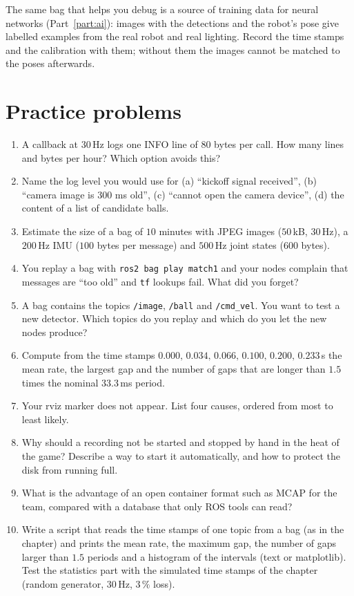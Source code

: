 \begin{aibox}
The same bag that helps you debug is a source of training data for neural networks (Part~\ref{part:ai}): images with the detections and the robot's pose give labelled examples from the real robot and real lighting. Record the time stamps and the calibration with them; without them the images cannot be matched to the poses afterwards.
\end{aibox}

\section*{Practice problems}
\begin{enumerate}[label=\textbf{\thechapter.\arabic*}]
  \item A callback at $30$\,Hz logs one INFO line of $80$ bytes per call. How many lines and bytes per hour? Which option avoids this?
  \item Name the log level you would use for (a) ``kickoff signal received'', (b) ``camera image is 300 ms old'', (c) ``cannot open the camera device'', (d) the content of a list of candidate balls.
  \item Estimate the size of a bag of $10$ minutes with JPEG images ($50$\,kB, $30$\,Hz), a $200$\,Hz IMU ($100$ bytes per message) and $500$\,Hz joint states ($600$ bytes).
  \item You replay a bag with \verb!ros2 bag play match1! and your nodes complain that messages are ``too old'' and \verb!tf! lookups fail. What did you forget?
  \item A bag contains the topics \verb!/image!, \verb!/ball! and \verb!/cmd_vel!. You want to test a new detector. Which topics do you replay and which do you let the new nodes produce?
  \item Compute from the time stamps $0.000,\,0.034,\,0.066,\,0.100,\,0.200,\,0.233$\,s the mean rate, the largest gap and the number of gaps that are longer than $1.5$ times the nominal $33.3$\,ms period.
  \item Your rviz marker does not appear. List four causes, ordered from most to least likely.
  \item Why should a recording not be started and stopped by hand in the heat of the game? Describe a way to start it automatically, and how to protect the disk from running full.
  \item What is the advantage of an open container format such as MCAP for the team, compared with a database that only ROS tools can read?
  \item[\textbf{\thechapter.10}$\star$] Write a script that reads the time stamps of one topic from a bag (as in the chapter) and prints the mean rate, the maximum gap, the number of gaps larger than $1.5$ periods and a histogram of the intervals (text or matplotlib). Test the statistics part with the simulated time stamps of the chapter (random generator, $30$\,Hz, $3\,\%$ loss).
\end{enumerate}
